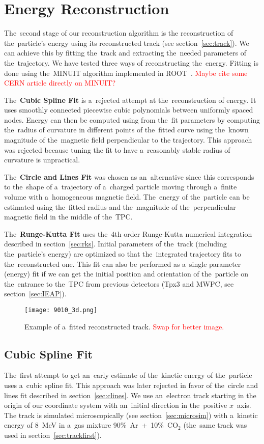 \chapter{Energy Reconstruction}
\label{sec:energy}
	The~second stage of our reconstruction algorithm is the reconstruction of the~particle's energy using its reconstructed track (see section~\ref{sec:track}). We can achieve this by fitting the~track and extracting the~needed parameters of the~trajectory. We have tested three ways of reconstructing the~energy. Fitting is done using the~MINUIT algorithm implemented in ROOT~\cite{ROOT}. \textcolor{red}{Maybe cite some CERN article directly on MINUIT?}
	
	The~\textbf{Cubic Spline Fit} is a~rejected attempt at the~reconstruction of energy. It uses smoothly connected piecewise cubic polynomials between uniformly spaced nodes. Energy can then be computed using from the~fit parameters by computing the~radius of curvature in different points of the~fitted curve using the~known magnitude of the~magnetic field perpendicular to the trajectory. This approach was rejected because tuning the fit to have a~reasonably stable radius of curvature is unpractical.
	
	The~\textbf{Circle and Lines Fit} was chosen as an~alternative since this corresponds to the~shape of a~trajectory of a~charged particle moving through a~finite volume with a~homogeneous magnetic field. The~energy of the~particle can be estimated using the~fitted radius and the~magnitude of the~perpendicular magnetic field in the middle of the~\ac{TPC}.
	
	The~\textbf{Runge-Kutta Fit} uses the~4th order Runge-Kutta numerical integration described in section~\ref{sec:rks}. Initial parameters of the~track (including the~particle's energy) are optimized so that the~integrated trajectory fits to the~reconstructed one. This fit can also be performed as a~single parameter (energy) fit if we can get the initial position and orientation of the~particle on the~entrance to the~\ac{TPC} from previous detectors (\ac{Tpx3} and \ac{MWPC}, see section~\ref{sec:IEAP}).
	
	\begin{figure}
		\centering
		\texttt{[image: 9010\_3d.png]}
		\caption{Example of a~fitted reconstructed track. \textcolor{red}{Swap for better image.}}
		\label{fig:90103d}
	\end{figure}
	
	\section{Cubic Spline Fit}
	\label{sec:cspline}
		The~first attempt to get an~early estimate of the~kinetic energy of the~particle uses a~cubic spline fit. This approach was later rejected in favor of the~circle and lines fit described in section~\ref{sec:clines}. We use an~electron track starting in the origin of our coordinate system with an~initial direction in the~positive $x$~axis. The track is simulated microscopically (see section~\ref{sec:microsim}) with a~kinetic energy of 8~MeV in a~gas mixture 90\%~Ar~+~10\%~CO$_2$ (the~same track was used in section~\ref{sec:trackfirst}).
				
